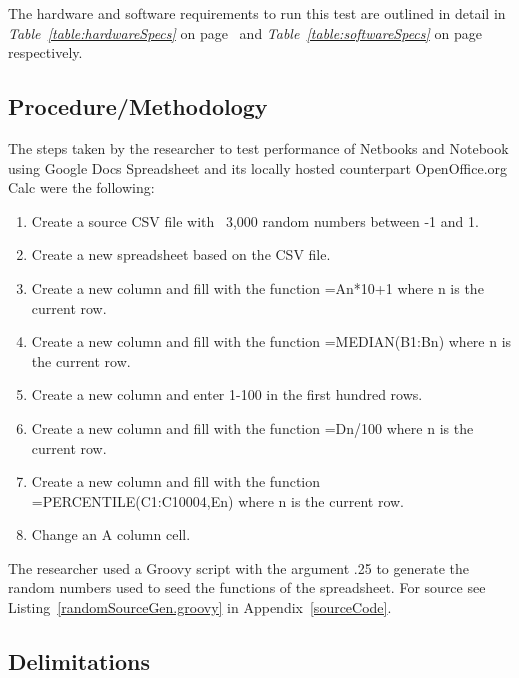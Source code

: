 The hardware and software requirements to run this test are outlined in detail
in \emph{Table~\ref{table:hardwareSpecs}} on page~\pageref{table:hardwareSpecs}
and \emph{Table~\ref{table:softwareSpecs}} on page~\pageref{table:softwareSpecs}
respectively.





\subsection{Procedure/Methodology}


The steps taken by the researcher to test performance of Netbooks and Notebook
using Google Docs Spreadsheet and its locally hosted counterpart OpenOffice.org
Calc were the following:

\begin{enumerate}
\item Create a source CSV file with ~3,000 random numbers between -1 and 1.
\item Create a new spreadsheet based on the CSV file.
\item Create a new column and fill with the function =An*10+1 where n is the
  current row.
\item Create a new column and fill with the function =MEDIAN(B1:Bn) where n is
  the current row.
\item Create a new column and enter 1-100 in the first hundred rows.
\item Create a new column and fill with the function =Dn/100 where n is the
  current row.
\item Create a new column and fill with the function =PERCENTILE(C1:C10004,En)
  where n is the current row.
\item Change an A column cell.
\end{enumerate}

The researcher used a Groovy script with the argument .25 to generate the random
numbers used to seed the functions of the spreadsheet.  For source
see Listing~\ref{randomSourceGen.groovy} in Appendix~\ref{sourceCode}.

\subsection{Delimitations}


